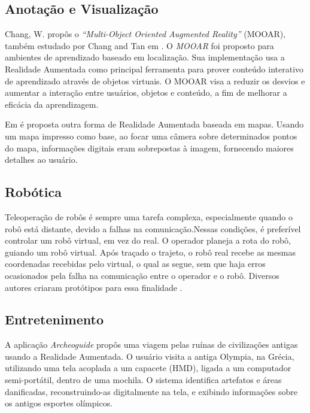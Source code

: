 \subsection{Anotação e Visualização}

Chang, W. \cite{MOOAR} propôs o
\textit{``Multi-Object Oriented Augmented Reality''} (MOOAR), também 
estudado por Chang and Tan em \cite{MOOAR_Study}. O \textit{MOOAR} foi
proposto para ambientes de aprendizado baseado em localização. Sua
implementação usa a Realidade Aumentada como principal ferramenta para
prover conteúdo interativo de aprendizado através de objetos virtuais.
O MOOAR visa a reduzir os desvios e aumentar a interação entre usuários,
objetos e conteúdo, a fim de melhorar a eficácia da aprendizagem.

Em \cite{AugmentedMaps} é proposta outra forma de Realidade Aumentada
baseada em mapas. Usando um mapa impresso como base, ao focar uma câmera sobre determinados
pontos do mapa, informações digitais eram sobrepostas à imagem, fornecendo maiores detalhes
ao usuário.



\subsection{Robótica}

Teleoperação de robôs é sempre uma tarefa complexa, especialmente quando o robô está distante, devido a falhas
na comunicação.Nessas condições, é preferível controlar um robô virtual, em vez do real. O operador planeja a 
rota do robô, guiando um robô virtual. Após traçado o trajeto, o robô real recebe as mesmas coordenadas recebidas
pelo virtual, o qual as segue, sem que haja erros ocasionados pela falha na comunicação entre o operador e o 
robô. Diversos autores criaram protótipos para essa finalidade \cite{RobotAR1,RobotAR2,RobotAR3}.


\subsection{Entretenimento}

A aplicação \textit{Archeoguide} \cite{Archeoguide} propôs uma viagem pelas ruínas de civilizações antigas usando
a Realidade Aumentada. O usuário visita a antiga Olympia, na Grécia, utilizando uma tela acoplada a um capacete
(\gls{HMD}), ligada a um computador semi-portátil, dentro de uma mochila. O sistema identifica 
artefatos e áreas danificadas, reconstruindo-as digitalmente na tela, e exibindo informações sobre os antigos 
esportes olímpicos. 

